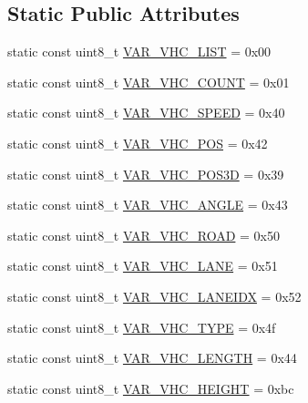 \subsection*{Static Public Attributes}
\begin{DoxyCompactItemize}
\item 
static const uint8\+\_\+t \hyperlink{classtraci__api_1_1_vehicle_manager_a3a3e88819303878e178eaf8b8bdbcef4}{V\+A\+R\+\_\+\+V\+H\+C\+\_\+\+L\+I\+ST} = 0x00
\item 
static const uint8\+\_\+t \hyperlink{classtraci__api_1_1_vehicle_manager_a2b2f33767a7e8ed8d9d64f6ee3ad4ae2}{V\+A\+R\+\_\+\+V\+H\+C\+\_\+\+C\+O\+U\+NT} = 0x01
\item 
static const uint8\+\_\+t \hyperlink{classtraci__api_1_1_vehicle_manager_a77976695ff8714a9122a3e940cc54e04}{V\+A\+R\+\_\+\+V\+H\+C\+\_\+\+S\+P\+E\+ED} = 0x40
\item 
static const uint8\+\_\+t \hyperlink{classtraci__api_1_1_vehicle_manager_a1788cd990fdaa86ccb0fe19fc7cce48d}{V\+A\+R\+\_\+\+V\+H\+C\+\_\+\+P\+OS} = 0x42
\item 
static const uint8\+\_\+t \hyperlink{classtraci__api_1_1_vehicle_manager_a545dfa38d9a38ece41697cfd4bf9d061}{V\+A\+R\+\_\+\+V\+H\+C\+\_\+\+P\+O\+S3D} = 0x39
\item 
static const uint8\+\_\+t \hyperlink{classtraci__api_1_1_vehicle_manager_a04d9e30519527b2dc7cd46b8ef1a3cb0}{V\+A\+R\+\_\+\+V\+H\+C\+\_\+\+A\+N\+G\+LE} = 0x43
\item 
static const uint8\+\_\+t \hyperlink{classtraci__api_1_1_vehicle_manager_a3dfae245f71178616fa4cbd355de8950}{V\+A\+R\+\_\+\+V\+H\+C\+\_\+\+R\+O\+AD} = 0x50
\item 
static const uint8\+\_\+t \hyperlink{classtraci__api_1_1_vehicle_manager_a77a3774d3a7434fc480201f70973e9e4}{V\+A\+R\+\_\+\+V\+H\+C\+\_\+\+L\+A\+NE} = 0x51
\item 
static const uint8\+\_\+t \hyperlink{classtraci__api_1_1_vehicle_manager_aabbd35962ffe19b69a014feb37bde0c4}{V\+A\+R\+\_\+\+V\+H\+C\+\_\+\+L\+A\+N\+E\+I\+DX} = 0x52
\item 
static const uint8\+\_\+t \hyperlink{classtraci__api_1_1_vehicle_manager_a9b212d9d477bebf7f2fe54f9c3555acb}{V\+A\+R\+\_\+\+V\+H\+C\+\_\+\+T\+Y\+PE} = 0x4f
\item 
static const uint8\+\_\+t \hyperlink{classtraci__api_1_1_vehicle_manager_a60eabc78c2a9d2f68e46fcbaf0dbb8b6}{V\+A\+R\+\_\+\+V\+H\+C\+\_\+\+L\+E\+N\+G\+TH} = 0x44
\item 
static const uint8\+\_\+t \hyperlink{classtraci__api_1_1_vehicle_manager_af4d5d1a208087f6d8fcf587d48d2bc3e}{V\+A\+R\+\_\+\+V\+H\+C\+\_\+\+H\+E\+I\+G\+HT} = 0xbc

\end{DoxyCompactItemize}
